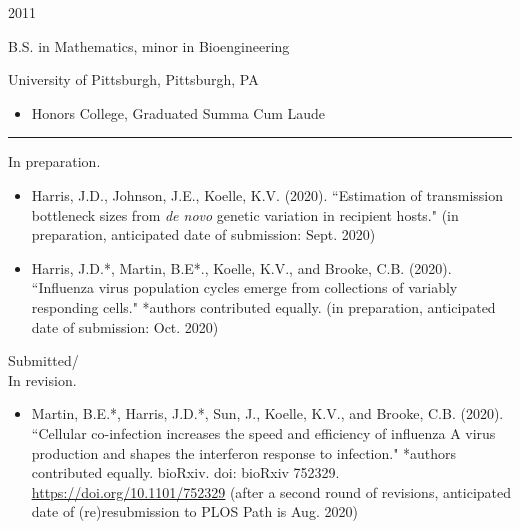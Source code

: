 \documentclass[a4paper,10pt]{article}
\newlength{\cvcolumngapwidth}
\newlength{\cvleftcolumnwidth}
\newlength{\cvrightcolumnwidth}
\newcommand{\cvsectionstyle}[1]{{\normalsize\cvsectionfont\textcolor{cvsectioncolor}{#1}}}
\newcommand{\cvtitlestyle}[1]{{\large\cvtitlefont\textcolor{cvtitlecolor}{#1}}}
\newcommand{\cvdurationstyle}[1]{{\small\cvdurationfont\textcolor{cvdurationcolor}{#1}}}
\newlength{\cvafteritemskipamount}
\newlength{\cvaftersectionskipamount}
\newlength{\cvbetweensectionandheadingextraskipamount}
\newlength{\cvaftertitleskipamount}
\newlength{\cvparskip}
\newcommand{\cvsection}[1]{
    \begin{minipage}[t]{\cvleftcolumnwidth}
        \raggedleft\cvsectionstyle{#1}
    \end{minipage}%
    \hspace{\cvcolumngapwidth}%
    \begin{minipage}[t]{\cvrightcolumnwidth}
        \textcolor{cvrulecolor}{\rule{\cvrightcolumnwidth}{0.3mm}}
    \end{minipage}

    \vspace{\cvaftersectionskipamount}
}
\newcommand{\cvitem}[2]{
    \begin{minipage}[t]{\cvleftcolumnwidth}
        \raggedleft #1
    \end{minipage}%
    \hspace{\cvcolumngapwidth}%
    \begin{minipage}[t]{\cvrightcolumnwidth}
        \setlength{\parskip}{\cvparskip} #2
    \end{minipage}

    \vspace{\cvafteritemskipamount}
}
\newcommand{\cvtitle}[1]{
    \cvtitlestyle{#1}

    \vspace{\cvaftertitleskipamount}
    \vspace{-\cvparskip}
}
\begin{document}
\cvitem{
    \cvdurationstyle{2011}
}{
    \cvtitle{B.S. in Mathematics, minor in Bioengineering}
	University of Pittsburgh, Pittsburgh, PA
    \begin{itemize}[leftmargin=*]
        \item  Honors College, Graduated Summa Cum Laude
    \end{itemize}
}

\cvsection{PUBLICATIONS}

\cvitem{
    \cvdurationstyle{In preparation.}
}{
    \begin{itemize}[leftmargin=*]
    	\item Harris, J.D., Johnson, J.E., Koelle, K.V. (2020). ``Estimation of transmission bottleneck sizes from \emph{de novo} genetic variation in recipient hosts." (in preparation, anticipated date of submission: Sept. 2020) \\
	\item Harris, J.D.*, Martin, B.E*., Koelle, K.V., and Brooke, C.B. (2020). ``Influenza virus population cycles emerge from collections of variably responding cells." *authors contributed equally. (in preparation, anticipated date of submission: Oct. 2020) \\
    \end{itemize}
}

\cvitem{
    \cvdurationstyle{Submitted/\\In revision.}
}{
    \begin{itemize}[leftmargin=*]
    	\item Martin, B.E.*, Harris, J.D.*, Sun, J., Koelle, K.V., and Brooke, C.B. (2020). ``Cellular co-infection increases the speed and efficiency of influenza A virus production and shapes the interferon response to infection."  *authors contributed equally. bioRxiv. doi: bioRxiv 752329. \href{https://doi.org/10.1101/752329}{\underline{https://doi.org/10.1101/752329}} (after a second round of revisions, anticipated date of (re)resubmission to PLOS Path is Aug. 2020) \\
    \end{itemize}
}
\end{document}
